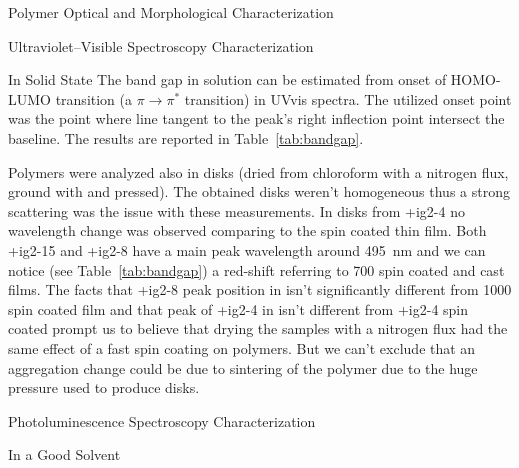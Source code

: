 \begin{section}{Polymer Optical and Morphological Characterization}
\begin{subsection}{Ultraviolet--Visible Spectroscopy Characterization}
\begin{subsubsection}{In Solid State}
The band gap in solution can be estimated from onset of \gls{HOMO}-\gls{LUMO} transition (a $\pi \rightarrow \pi^*$ transition) in \gls{UVvis} spectra. The utilized onset point was the point where line tangent to the peak's right inflection point intersect the baseline. The results are reported in Table~\ref{tab:bandgap}. 

Polymers were analyzed also in  disks (dried from chloroform with a nitrogen flux, ground with  and pressed). The obtained disks weren't homogeneous thus a strong scattering was the issue with these measurements. %
In disks from \cmpd+{ig2-4} no wavelength change was observed comparing to the spin coated thin film. 
Both \cmpd+{ig2-15} and \cmpd+{ig2-8} have a main peak wavelength around \SI{495}{\nm} and we can notice (see Table~\ref{tab:bandgap}) a red-shift referring to \SI{700}{\rpm} spin coated and cast films. The facts that \cmpd+{ig2-8} peak position in  isn't significantly different from \SI{1000}{\rpm} spin coated film and that peak of \cmpd+{ig2-4} in  isn't different from \cmpd+{ig2-4} spin coated prompt us to believe that drying the samples with a nitrogen flux had the same effect of a fast spin coating on polymers. But we can't exclude that an aggregation change could be due to sintering of the polymer due to the huge pressure used to produce  disks. 

\end{subsubsection}
\end{subsection}
\clearpage
\begin{subsection}{Photoluminescence Spectroscopy Characterization}
\label{sec:pl}

\begin{subsubsection}{In a Good Solvent}


\end{subsubsection}
\end{subsection}
\end{section}
